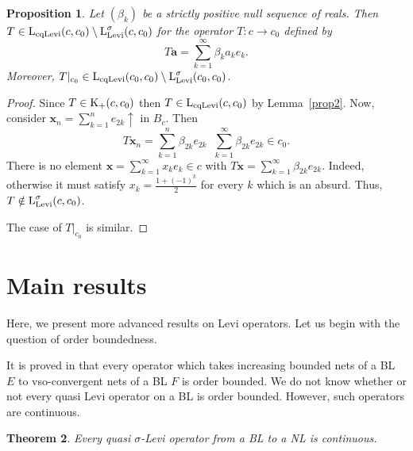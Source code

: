 \documentclass[10pt]{article}
\makeatletter
\newtheorem{theorem}{Theorem}[section]
\newtheorem{proposition}[theorem]{Proposition}
\DeclareMathOperator{\convo}{\xrightarrow[]{o}}
\renewcommand{\subsection}{\@startsection{subsection}{1}
{0pt}{3.25ex plus 1ex minus.2ex}{-1em}{\normalfont\normalsize\bf}}
\makeatother
\begin{document}
{{{\begin{proposition}\label{prop1aa}%
Let $(\beta_k)$ be a strictly positive null sequence of reals.
Then $T\in\text{\rm L}_{\text{\rm cqLevi}}(c,c_0)\setminus\text{\rm L}^\sigma_{\text{\rm Levi}}(c,c_0)$
for the operator $T:c\to c_0$ defined by 
$$
   T\mathbf{a} = \sum_{k=1}^\infty\beta_k a_ke_k. 
$$
Moreover, $T|_{c_0}\in\text{\rm L}_{\text{\rm cqLevi}}(c_0,c_0)
\setminus\text{\rm L}^\sigma_{\text{\rm Levi}}(c_0,c_0)$.
\end{proposition}

\begin{proof}
Since $T\in\text{\rm K}_+(c,c_0)$ then $T\in\text{\rm L}_{\text{\rm cqLevi}}(c,c_0)$ by Lemma~\ref{prop2}. 
Now, consider $\mathbf{x}_n=\sum\limits_{k=1}^n e_{2k}\uparrow$ in $B_{c}$. Then 
$$
   T\mathbf{x}_n =\sum\limits_{k=1}^n\beta_{2k} e_{2k}\convo
   \sum\limits_{k=1}^{\infty}\beta_{2k} e_{2k}\in c_0. 
$$
There is no element $\mathbf{x}=\sum\limits_{k=1}^\infty x_k e_k\in c$ with
$T\mathbf{x}=\sum\limits_{k=1}^{\infty}\beta_{2k} e_{2k}$.
Indeed, otherwise it must satisfy $x_k=\frac{1+(-1)^k}{2}$ for every $k$ which is an absurd. 
Thus, $T\notin\text{\rm L}^\sigma_{\text{\rm Levi}}(c,c_0)$.

\medskip
The case of $T|_{c_0}$ is similar.
\end{proof}

\section{Main results}

\hspace{4mm}
Here, we present more advanced results on Levi operators.
Let us begin with the question of order boundedness.

\medskip
It is proved in \cite[Theorem 2.2]{ZC2022} that every operator which takes increasing bounded nets
of a BL $E$ to vso-convergent nets of a BL $F$ is order bounded. We do not know whether or not every 
quasi Levi operator on a BL is order bounded. However, such operators are continuous.

\medskip
\begin{theorem}\label{T5c}%
Every quasi $\sigma$-Levi operator from a BL to a NL is continuous.
\end{theorem}

}}}
\end{document}
